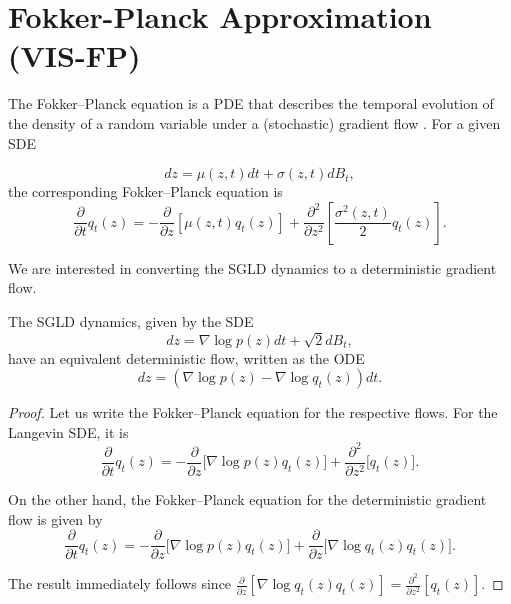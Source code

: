 
\section{Fokker-Planck Approximation (VIS-FP)}\label{app:fp}
  
  The Fokker--Planck equation is a PDE %
  that describes the temporal evolution of the density of a random variable under a (stochastic) gradient flow \parencite{pavliotis2014stochastic}. For a given SDE %
  
$$
dz = \mu(z,t)dt + \sigma(z,t)dB_t,
$$
the corresponding Fokker--Planck equation is
$$
\frac{\partial}{\partial t} q_t(z) = -\frac{\partial}{\partial z}\left[ \mu(z,t)q_t(z)\right] + \frac{\partial^2}{\partial z^2} \left[ \frac{\sigma^2(z,t)}{2} q_t(z) \right].
$$

We are interested in converting the SGLD dynamics to a deterministic gradient flow. %

\begin{Proposition}
The SGLD dynamics, given by the SDE
$$
dz = \nabla \log p(z)dt + \sqrt{2}dB_t,
$$
have an equivalent deterministic flow, written as the ODE %
$$
dz = (\nabla \log p(z) - \nabla \log q_t (z))dt.
$$
\end{Proposition}
\begin{proof}
Let us write the Fokker--Planck equation for the respective flows. For the Langevin SDE, it is 
$$
\frac{\partial}{\partial t} q_t(z) = - \frac{\partial}{\partial z} \bigg[ \nabla \log p(z) q_t(z) \bigg] + \frac{\partial^2}{\partial z^2} \bigg[ q_t(z) \bigg].
$$

On the other hand, the Fokker--Planck equation for the deterministic gradient flow is given by
$$
\frac{\partial}{\partial t} q_t(z) = - \frac{\partial}{\partial z} \bigg[ \nabla \log p(z) q_t(z)\bigg] + \frac{\partial}{\partial z} \bigg[ \nabla \log q_t(z) q_t(z)\bigg].
$$

The result immediately follows since $ \frac{\partial}{\partial z} \left[ \nabla \log q_t(z) q_t(z)\right] = \frac{\partial^2}{\partial z^2} \left[ q_t(z) \right]$.
\end{proof}

